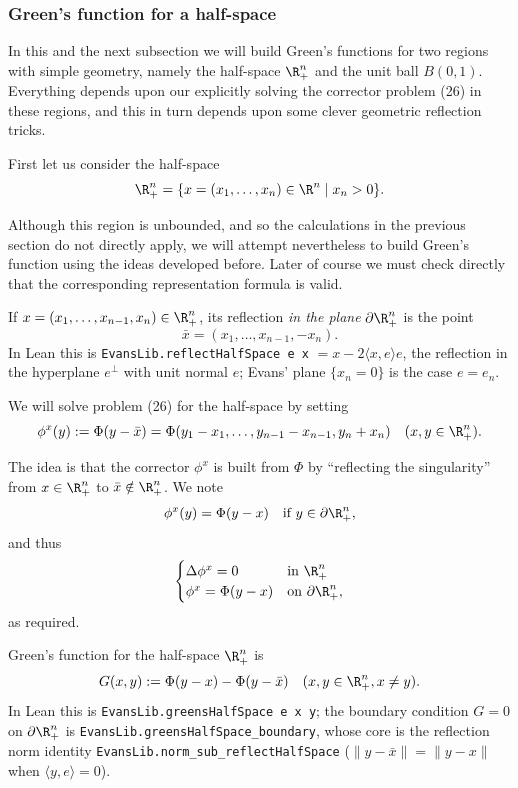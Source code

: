 \subsubsection{Green's function for a half-space}
\label{sec:laplace-greens-function-half-space}

In this and the next subsection we will build Green's functions for two regions with simple geometry, namely the half-space $\R^n_+$ and the unit ball $B(0,1)$. Everything depends upon our explicitly solving the corrector problem (26) in these regions, and this in turn depends upon some clever geometric reflection tricks.

First let us consider the half-space
$$\R^n_+ = \{x = (x_1,\ldots,x_n) \in \R^n \mid x_n > 0\}.$$

Although this region is unbounded, and so the calculations in the previous section do not directly apply, we will attempt nevertheless to build Green's function using the ideas developed before. Later of course we must check directly that the corresponding representation formula is valid.

\begin{definition}
\label{def:reflection-half-space}
\leanok
If $x = (x_1, \ldots, x_{n-1}, x_n) \in \R^n_+$, its reflection \textit{in the plane} $\partial \R^n_+$ is the point
$$\bar{x} = (x_1, \ldots, x_{n-1}, -x_n).$$
In Lean this is \lstinline{EvansLib.reflectHalfSpace e x} $= x - 2\langle x,e\rangle e$, the
reflection in the hyperplane $e^\perp$ with unit normal $e$; Evans' plane $\{x_n = 0\}$
is the case $e = e_n$.
\end{definition}

We will solve problem (26) for the half-space by setting
$$\phi^x(y) := \Phi(y - \bar{x}) = \Phi(y_1 - x_1, \ldots, y_{n-1} - x_{n-1}, y_n + x_n) \quad (x, y \in \R^n_+).$$

The idea is that the corrector $\phi^x$ is built from $\Phi$ by ``reflecting the singularity'' from $x \in \R^n_+$ to $\bar{x} \notin \R^n_+$. We note
$$\phi^x(y) = \Phi(y - x) \quad \text{if } y \in \partial \R^n_+,$$
and thus
$$\begin{cases}
\Delta \phi^x = 0 & \text{in } \R^n_+ \\
\phi^x = \Phi(y - x) & \text{on } \partial \R^n_+,
\end{cases}$$
as required.

\begin{definition}
\label{def:greens-function-half-space}
\leanok
Green's function for the half-space $\R^n_+$ is
$$G(x, y) := \Phi(y - x) - \Phi(y - \bar{x}) \quad (x, y \in \R^n_+, x \neq y).$$
In Lean this is \lstinline{EvansLib.greensHalfSpace e x y}; the boundary condition
$G = 0$ on $\partial\R^n_+$ is \lstinline{EvansLib.greensHalfSpace_boundary}, whose core
is the reflection norm identity \lstinline{EvansLib.norm_sub_reflectHalfSpace}
($\|y - \bar x\| = \|y - x\|$ when $\langle y,e\rangle = 0$).
\end{definition}

